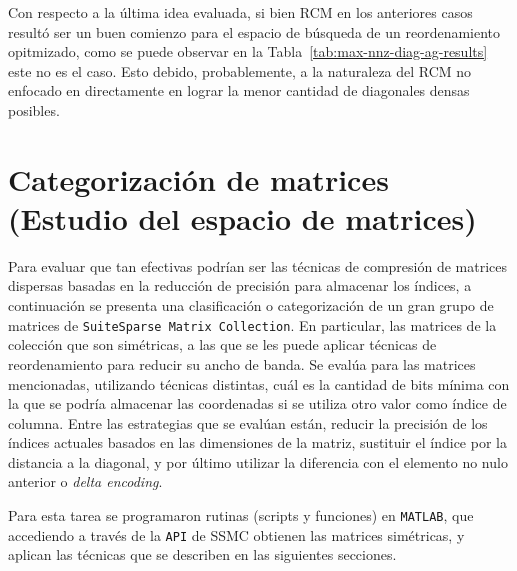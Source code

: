 Con respecto a la última idea evaluada, si bien RCM en los anteriores casos resultó ser un buen comienzo para el espacio de búsqueda de un reordenamiento opitmizado, como se puede observar en la Tabla~\ref{tab:max-nnz-diag-ag-results} este no es el caso. Esto debido, probablemente, a la naturaleza del RCM no enfocado en directamente en lograr la menor cantidad de diagonales densas posibles.


\section{Categorización de matrices (Estudio del espacio de matrices)}\label{sec:matrix-cat}

Para evaluar que tan efectivas podrían ser las técnicas de compresión de matrices dispersas basadas en la reducción de precisión para almacenar los índices, a continuación se presenta una clasificación o categorización de un gran grupo de matrices de \texttt{SuiteSparse Matrix Collection}. En particular, las matrices de la colección que son simétricas, a las que se les puede aplicar técnicas de reordenamiento para reducir su ancho de banda. Se evalúa para las matrices mencionadas, utilizando técnicas distintas, cuál es la cantidad de bits mínima con la que se podría almacenar las coordenadas si se utiliza otro valor como índice de columna. Entre las estrategias que se evalúan están, reducir la precisión de los índices actuales basados en las dimensiones de la matriz, sustituir el índice por la distancia a la diagonal, y por último utilizar la diferencia con el elemento no nulo anterior o \textit{delta encoding}.

Para esta tarea se programaron rutinas (scripts y funciones) en \texttt{MATLAB}, que accediendo a través de la \texttt{API} de SSMC obtienen las matrices simétricas, y aplican las técnicas que se describen en las siguientes secciones. 



